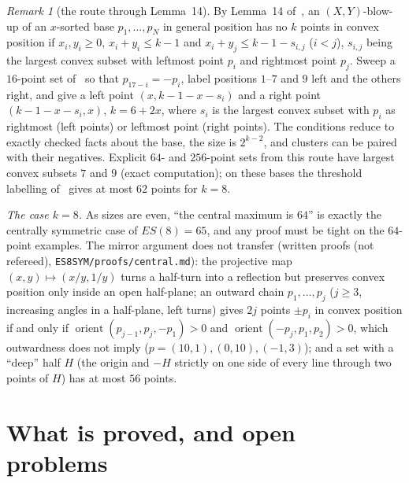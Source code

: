 \documentclass[10pt]{article}
\theoremstyle{definition}
\theoremstyle{remark}
\newtheorem{remark}[theorem]{Remark}
\newcommand{\orient}{\operatorname{orient}}
\newcommand{\dirn}[1]{{\upshape\nolinkurl{#1}}}
\begin{document}
\begin{remark}[the route through Lemma~14]\label{rem:lemma14}
By Lemma~14 of~\cite{BB25}, an $(X,Y)$-blow-up of an $x$-sorted base $p_1,\dots,p_N$ in general position has no $k$
points in convex position if $x_i,y_i\ge0$, $x_i+y_i\le k-1$ and $x_i+y_j\le k-1-s_{i,j}$ ($i<j$), $s_{i,j}$ being the
largest convex subset with leftmost point $p_i$ and rightmost point $p_j$. Sweep a $16$-point set of~\cite{SMQH25,Mac25} so that
$p_{17-i}=-p_i$, label positions $1$--$7$ and $9$ left and the others right, and give a left point $(x,k-1-x-s_i)$ and a
right point $(k-1-x-s_i,x)$, $k=6+2x$, where $s_i$ is the largest convex subset with $p_i$ as rightmost (left points) or
leftmost point (right points). The conditions reduce to exactly checked facts about the base, the size is $2^{k-2}$, and
clusters can be paired with their negatives. Explicit $64$- and $256$-point sets from this route have largest convex
subsets $7$ and $9$ (exact computation); on these bases the threshold labelling of~\cite[Cor.~15]{BB25} gives at most
$62$ points for $k=8$.
\end{remark}

\noindent\emph{The case $k=8$.} As sizes are even, ``the central maximum is $64$'' is exactly the centrally symmetric
case of $ES(8)=65$, and any proof must be tight on the $64$-point examples. The mirror argument does not transfer
(written proofs (not refereed), \dirn{ES8SYM/proofs/central.md}): the projective map $(x,y)\mapsto(x/y,1/y)$ turns a
half-turn into a reflection but preserves convex position only inside an open half-plane; an outward chain
$p_1,\dots,p_j$ ($j\ge3$, increasing angles in a half-plane, left turns) gives $2j$ points $\pm p_i$ in convex position if
and only if $\orient(p_{j-1},p_j,-p_1)>0$ and $\orient(-p_j,p_1,p_2)>0$, which outwardness does not imply
($p=(10,1),(0,10),(-1,3)$); and a set with a ``deep'' half $H$ (the origin and $-H$ strictly on one side of every
line through two points of $H$) has at most $56$ points.

\section{What is proved, and open problems}\label{sec:rigor}
\end{document}
